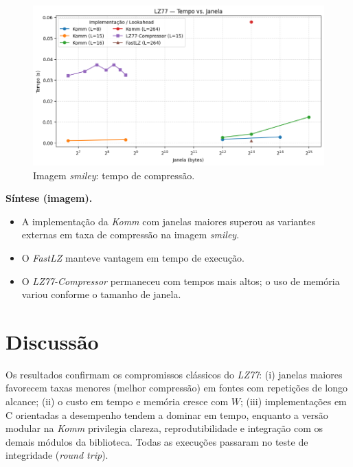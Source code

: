 \begin{figure}[htp]
  \centering
  \caption{Imagem \textit{smiley}: tempo de compressão.}
  \label{fig:external-smiley-time}
  \includegraphics[width=15cm]{figuras/lz77_smiley_time_window.png}
\end{figure}

\noindent\textbf{Síntese (imagem).}
\begin{itemize}
  \item A implementação da \textit{Komm} com janelas maiores superou as variantes externas em taxa de compressão na imagem \textit{smiley}.
  \item O \textit{FastLZ} manteve vantagem em tempo de execução.
  \item O \textit{LZ77-Compressor} permaneceu com tempos mais altos; o uso de memória variou conforme o tamanho de janela.
\end{itemize}

\section{Discussão}

Os resultados confirmam os compromissos clássicos do \textit{LZ77}: (i) janelas maiores favorecem taxas menores (melhor compressão) em fontes com repetições de longo alcance; (ii) o custo em tempo e memória cresce com \(W\); (iii) implementações em C orientadas a desempenho tendem a dominar em tempo, enquanto a versão modular na \textit{Komm} privilegia clareza, reprodutibilidade e integração com os demais módulos da biblioteca. Todas as execuções passaram no teste de integridade (\emph{round trip}).

